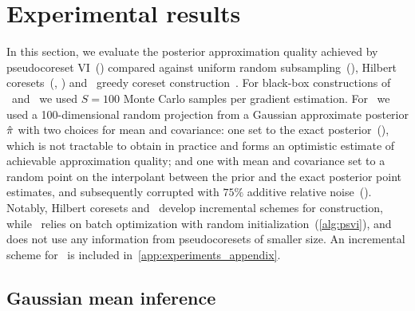 \section{Experimental results}
\label{sec:experiments}
In this section, we evaluate the posterior approximation quality achieved by
pseudocoreset VI~(\psvi) compared against uniform random subsampling~(\uniform), Hilbert
coresets~(\giga, \citep{campbell18}) and \sparsevi~greedy coreset
construction~\citep{campbell19neurips}.  For black-box constructions of \sparsevi~and \psvi~we used $S =
100$ Monte Carlo samples per gradient estimation. For \giga~we used a
100-dimensional random projection from a Gaussian approximate posterior $\hat{\pi}$
with  two choices for mean and covariance: one set to the exact
posterior~(\optimal), which is not tractable to obtain in practice and forms an
optimistic estimate of achievable approximation quality; and one with mean and
covariance set to a random point on the interpolant between the prior and the
exact posterior point estimates, and subsequently corrupted with $75\%$
additive relative noise~(\realistic). Notably, Hilbert coresets and
\sparsevi~develop incremental schemes for construction, while \psvi~relies on
batch optimization with random initialization~(\cref{alg:psvi}), and does not
use any information from pseudocoresets of smaller size. An incremental scheme
for \sparsevi~is included in~\cref{app:experiments_appendix}. %

\subsection{Gaussian mean inference}
\label{section:gaussian_experiment}

